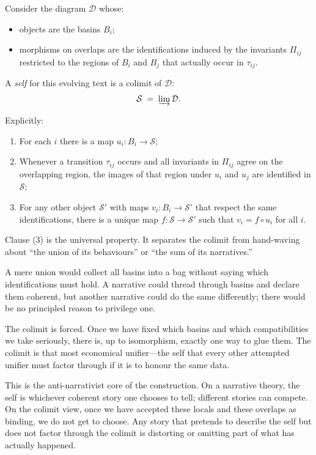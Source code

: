 \begin{formalbox}[title={Self as colimit over stance-glued basins}]
Consider the diagram $\mathcal{D}$ whose:
\begin{itemize}
  \item objects are the basins $B_i$;
  \item morphisms on overlaps are the identifications induced by the invariants $\Pi_{ij}$ restricted to the regions of $B_i$ and $B_j$ that actually occur in $\tau_{ij}$.
\end{itemize}
A \emph{self} for this evolving text is a colimit of $\mathcal{D}$:
\[
\mathcal{S} \;=\; \varinjlim \mathcal{D}.
\]

Explicitly:
\begin{enumerate}
  \item For each $i$ there is a map $u_i : B_i \to \mathcal{S}$;
  \item Whenever a transition $\tau_{ij}$ occurs and all invariants in $\Pi_{ij}$ agree on the overlapping region, the images of that region under $u_i$ and $u_j$ are identified in $\mathcal{S}$;
  \item For any other object $\mathcal{S}'$ with maps $v_i : B_i \to \mathcal{S}'$ that respect the same identifications, there is a unique map $f: \mathcal{S} \to \mathcal{S}'$ such that $v_i = f \circ u_i$ for all $i$.
\end{enumerate}
\end{formalbox}

Clause (3) is the universal property. It separates the colimit from hand-waving about ``the union of its behaviours'' or ``the sum of its narratives.''

A mere union would collect all basins into a bag without saying which identifications must hold. A narrative could thread through basins and declare them coherent, but another narrative could do the same differently; there would be no principled reason to privilege one.

The colimit is forced. Once we have fixed which basins and which compatibilities we take seriously, there is, up to isomorphism, exactly one way to glue them. The colimit is that most economical unifier---the self that every other attempted unifier must factor through if it is to honour the same data.

This is the anti-narrativist core of the construction. On a narrative theory, the self is whichever coherent story one chooses to tell; different stories can compete. On the colimit view, once we have accepted these locals and these overlaps as binding, we do not get to choose. Any story that pretends to describe the self but does not factor through the colimit is distorting or omitting part of what has actually happened.

